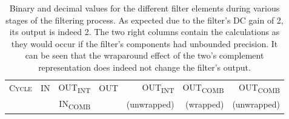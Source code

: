 \begin{table}
    \centering
    \caption[CIC Filter Example: States for 16 Cycles]{%
        Binary and  decimal values  for the  different filter  elements during
        various  stages  of the  filtering  process. As  expected due  to  the
        filter's DC  gain of  \num{2}, its output  is indeed  \num{2}. The two
        right  columns contain  the calculations  as they  would occur  if the
        filter's components had  unbounded precision. It can be  seen that the
        wraparound effect  of the two's complement  representation does indeed
        not change the filter's output.%
    }
    \label{tab:cic_simu:cic_filter_states}
    \ttfamily
    \begin{tabular}{rrrrrrr}
        \toprule
        \scshape Cycle                   &
        \scshape IN                      &
        \scshape OUT\textsubscript{INT}  &
        \scshape OUT                     &
        \scshape OUT\textsubscript{INT}  &
        \scshape OUT\textsubscript{COMB} &
        \scshape OUT\textsubscript{COMB} \\

        &
        &
        \scshape IN\textsubscript{COMB} &
        &
        (unwrapped) &
        (wrapped)   &
        (unwrapped) \\


\end{tabular}
\end{table}
